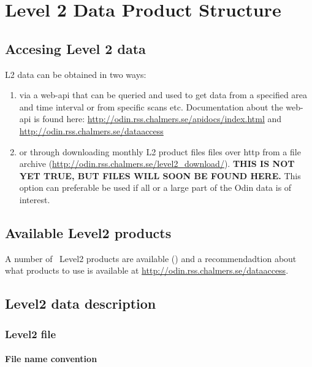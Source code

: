 \chapter{Level 2 Data Product Structure}
\label{chapter:L2_structure}

\section{Accesing Level 2 data}

L2 data can be obtained in two ways:

\begin{enumerate}

\item via a web-api that can be queried and used to get data from
  a specified area and time interval or from specific scans etc.
  Documentation about the web-api is found here: 
  \url{http://odin.rss.chalmers.se/apidocs/index.html} and
  \url{http://odin.rss.chalmers.se/dataaccess}

\item or through downloading monthly L2 product files files over http
  from a file archive (\url{http://odin.rss.chalmers.se/level2_download/}).
  \textbf{THIS IS NOT YET TRUE, BUT FILES WILL SOON BE FOUND HERE.}
  This option can preferable be used if all or a large part of the
  Odin data is of interest.

\end{enumerate}


\section{Available Level2 products}

A number of \smr\ Level2 products are available (\cite{dds}) and
a recommendadtion about what products to use is available
at \url{http://odin.rss.chalmers.se/dataaccess}.


\section{Level2 data description}

\subsection{Level2 file}

\subsubsection{File name convention}

